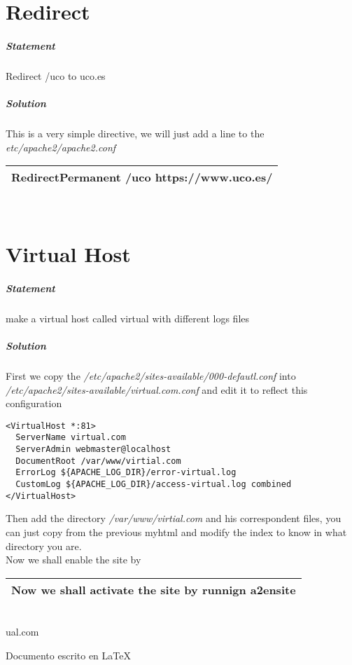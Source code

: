 \documentclass[a4paper,10pt]{article}
\newcommand\tab[1][1cm]{\hspace*{#1}}
\begin{document}
\section{Redirect}
\subparagraph{Statement}
Redirect /uco to uco.es
\subparagraph{Solution}
This is a very simple directive, we will just add a line to the {\it etc/apache2/apache2.conf}
\vspace{0.5cm}\\\begin{tabular}{|l|}\hline
RedirectPermanent /uco https://www.uco.es/
\\\hline\end{tabular}\vspace{0.5cm}\\

\section{Virtual Host}
\subparagraph{Statement}
make a virtual host called virtual with different logs files
\subparagraph{Solution}
First we copy the {\it /etc/apache2/sites-available/000-defautl.conf} into {\it /etc/apache2/sites-available/virtual.com.conf} and edit it to reflect this configuration
\begin{verbatim}
<VirtualHost *:81>
  ServerName virtual.com
  ServerAdmin webmaster@localhost
  DocumentRoot /var/www/virtial.com
  ErrorLog ${APACHE_LOG_DIR}/error-virtual.log
  CustomLog ${APACHE_LOG_DIR}/access-virtual.log combined
</VirtualHost>
\end{verbatim}
Then add the directory {\it /var/www/virtial.com} and his correspondent files, you can just copy from the previous myhtml and modify the index to know in what directory you are.\vspace{0.5cm}\\\tab
Now we shall enable the site by 
\vspace{0.5cm}\\\begin{tabular}{|l|}\hline
Now we shall activate the site by runnign a2ensite
\\\hline\end{tabular}\vspace{0.5cm}\\ual.com


\vspace*{\fill} %
\raggedleft Documento escrito en \LaTeX{}
\end{document}
